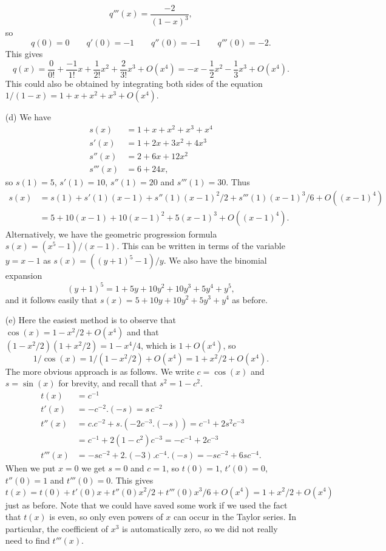 \documentclass[a4paper]{amsart}
\theoremstyle{definition}
\newenvironment{solution}{{\noindent \bf Solution:}}{}
\begin{document}
\begin{solution}
\begin{itemize}
\[      q'''(x) = \frac{-2}{(1-x)^3},
   \]
   so 
   \[ q(0) = 0 \hspace{2em}
      q'(0) = -1 \hspace{2em}
      q''(0) = -1 \hspace{2em}
      q'''(0) = -2.
   \]
   This gives 
   \[ q(x) =
       \frac{0}{0!} + \frac{-1}{1!} x + \frac{1}{2!} x^2 + \frac{2}{3!} x^3 + O(x^4)
      = -x-\frac{1}{2}x^2-\frac{1}{3}x^3 + O(x^4).
   \]
   This could also be obtained by integrating both sides of the
   equation $1/(1-x)=1+x+x^2+x^3+O(x^4)$.
  \item[(d)] We have
   \begin{align*}
    s(x)    &= 1 + x + x^2 + x^3 + x^4 \\
    s'(x)   &= 1 + 2x + 3x^2 + 4x^3 \\
    s''(x)  &= 2 + 6x + 12x^2 \\
    s'''(x) &= 6 + 24x,
   \end{align*}
   so $s(1)=5$, $s'(1)=10$, $s''(1)=20$ and $s'''(1)=30$.
   Thus 
   \begin{align*}
    s(x)
     &= s(1) + s'(1)(x-1) +
        s''(1)(x-1)^2/2 + s'''(1)(x-1)^3/6 +
        O((x-1)^4) \\
     &= 5 + 10(x-1) + 10(x-1)^2 + 5(x-1)^3 + O((x-1)^4).
   \end{align*}
   Alternatively, we have the geometric progression formula
   $s(x)=(x^5-1)/(x-1)$.  This can be written in terms of the variable
   $y=x-1$ as $s(x)=((y+1)^5-1)/y$.  We also have the binomial
   expansion 
   \[ (y+1)^5 = 1+5y+10y^2+10y^3+5y^4+y^5, \]
   and it follows easily that $s(x)=5+10y+10y^2+5y^3+y^4$ as before.
  \item[(e)] Here the easiest method is to observe that
   $\cos(x)=1-x^2/2+O(x^4)$ and that
   $(1-x^2/2)(1+x^2/2)=1-x^4/4$, which is $1+O(x^4)$, so
   \[ 1/\cos(x)=1/(1-x^2/2)+O(x^4)=1+x^2/2+O(x^4). \]
   The more obvious approach is as follows.  We write
   $c=\cos(x)$ and $s=\sin(x)$ for brevity, and recall that
   $s^2=1-c^2$. 
   \begin{align*}
    t(x) &= c^{-1} \\
    t'(x) &= -c^{-2}.(-s) = s\,c^{-2} \\
    t''(x) &= c.c^{-2} + s.(-2c^{-3}.(-s)) 
            = c^{-1} + 2s^2c^{-3} \\
           &= c^{-1} + 2(1-c^2) c^{-3} = -c^{-1} + 2c^{-3} \\
    t'''(x) &= -sc^{-2} + 2.(-3).c^{-4}.(-s) 
             = -sc^{-2} + 6sc^{-4}.
   \end{align*}
   When we put $x=0$ we get $s=0$ and $c=1$, so 
   $t(0)=1$, $t'(0)=0$, $t''(0)=1$ and $t'''(0)=0$.  This
   gives
   \[ t(x)
       = t(0) + t'(0)x + t''(0)x^2/2 + t'''(0)x^3/6 + O(x^4)
       = 1 + x^2/2 + O(x^4)
   \]
   just as before.  Note that we could have saved some work if we used
   the fact that $t(x)$ is even, so only even powers of $x$ can occur
   in the Taylor series.  In particular, the coefficient of $x^3$ is
   automatically zero, so we did not really need to find $t'''(x)$.
 \end{itemize}
\end{solution}
\end{document}
